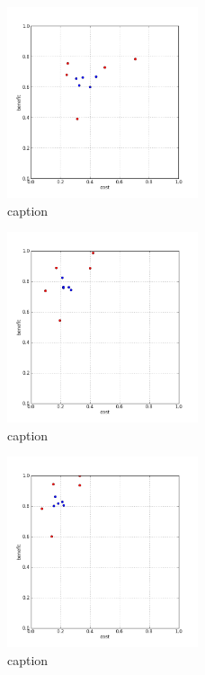 %
\begin{figure}[!ht]
	\centering
	\includegraphics[width=0.5\textwidth]{img/p1figs/computeFrameStateCummulative_simpleCompare_smooth12_tol0.png}
	\caption{caption}
\end{figure}
%
\begin{figure}[!ht]
	\centering
	\includegraphics[width=0.5\textwidth]{img/p1figs/computeFrameStateLauge_sectionCompareBetter_smooth0_tol12.png}
	\caption{caption}
\end{figure}
%
\begin{figure}[!ht]
	\centering
	\includegraphics[width=0.5\textwidth]{img/p1figs/computeFrameStateLauge_sectionCompareBetter_smooth0_tol24.png}
	\caption{caption}
\end{figure}
